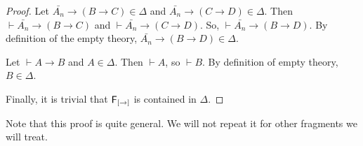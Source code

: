 \documentclass[12pt]{article}
\begin{document}
\begin{proof}
Let $\bar{A_{n}}\rightarrow (B\rightarrow C) \in \Delta$ and $\bar{A_{n}}\rightarrow (C\rightarrow D) \in \Delta$. Then $ \vdash \bar{A_{n}}\rightarrow (B\rightarrow C) $ and $ \vdash\bar{A_{n}}\rightarrow (C\rightarrow D)$. So, $\vdash \bar{A_{n}}\rightarrow (B\rightarrow D)$.  By definition of the empty theory, $\bar{A_{n}}\rightarrow (B\rightarrow D) \in \Delta  $.

\noindent Let $ \vdash A\rightarrow B $ and $ A \in \Delta $. Then  $ \vdash A $, so $ \vdash B $. By definition of empty theory,  $ B \in \Delta $.

\noindent Finally, it is trivial that ${\sf F_{[\rightarrow]}}$ is contained in $ \Delta $.
\end{proof}

Note that this proof is quite general. We will not repeat it for other fragments we will treat.
\end{document}

